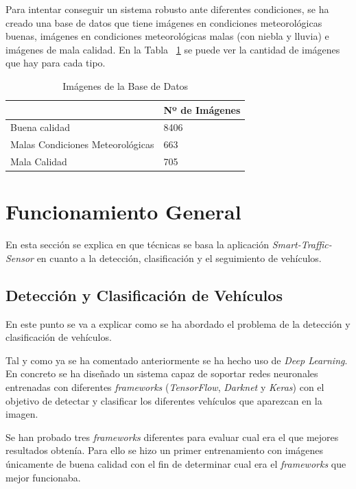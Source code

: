 Para intentar conseguir un sistema robusto ante diferentes condiciones, se ha creado una base de datos que tiene imágenes en condiciones meteorológicas buenas, imágenes en condiciones meteorológicas malas (con niebla y lluvia) e imágenes de mala calidad. En la Tabla ~\ref{tabla_img_base_datos} se puede ver la cantidad de imágenes que hay para cada tipo.
\begin{table}[htb]
\begin{center}
\begin{tabular}{|l|l|}
\hline
\cline{2-2}& Nº de Imágenes\\
\hline \hline
Buena calidad & 8406 \\ \hline
Malas Condiciones Meteorológicas & 663\\ \hline
Mala Calidad & 705\\ \hline
\end{tabular}
\caption{Imágenes de la Base de Datos}
\label{tabla_img_base_datos}
\end{center}
\end{table}

\section{Funcionamiento General}

En esta sección se explica en que técnicas se basa la aplicación \textit{Smart-Traffic-Sensor} en cuanto a la detección, clasificación y el seguimiento de vehículos.

\subsection{Detección y Clasificación de Vehículos}

En este punto se va a explicar como se ha abordado el problema de la detección y clasificación de vehículos.

Tal y como ya se ha comentado anteriormente se ha hecho uso de \textit{Deep Learning}. En concreto se ha diseñado un sistema capaz de soportar redes neuronales entrenadas con diferentes \textit{frameworks} (\textit{TensorFlow}, \textit{Darknet} y \textit{Keras}) con el objetivo de detectar y clasificar los diferentes vehículos que aparezcan en la imagen.

Se han probado tres \textit{frameworks} diferentes para evaluar cual era el que mejores resultados obtenía. Para ello se hizo un primer entrenamiento con imágenes únicamente de buena calidad con el fin de determinar cual era el \textit{frameworks} que mejor funcionaba.

